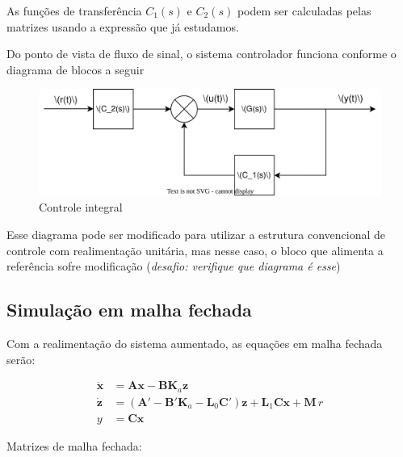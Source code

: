 \documentclass[
]{book}
\begin{document}
As funções de transferência \(C_1(s)\) e \(C_2(s)\) podem ser calculadas
pelas matrizes usando a expressão que já estudamos.

Do ponto de vista de fluxo de sinal, o sistema controlador funciona
conforme o diagrama de blocos a seguir

\begin{figure}
\includegraphics[width=1\linewidth]{./figs/controleIntegral} \caption{Controle integral}\label{fig:unnamed-chunk-45}
\end{figure}

Esse diagrama pode ser modificado para utilizar a estrutura convencional
de controle com realimentação unitária, mas nesse caso, o bloco que
alimenta a referência sofre modificação (\emph{desafio: verifique que
diagrama é esse})

\hypertarget{simulauxe7uxe3o-em-malha-fechada-1}{%
\subsection{Simulação em malha fechada}\label{simulauxe7uxe3o-em-malha-fechada-1}}

Com a realimentação do sistema aumentado, as equações em malha fechada
serão:

\begin{align*}
\dot{\mathbf{x}} &= \mathbf{A}\mathbf{x}-\mathbf{B}\mathbf{K}_a\mathbf{z}\\
\dot{\mathbf{z}} &= (\mathbf{A'}-\mathbf{B'}\mathbf{K}_a-\mathbf{L}_0\mathbf{C}')\mathbf{z}+\mathbf{L}_1\mathbf{C}\mathbf{x}+\mathbf{M}\, r\\
y&= \mathbf{Cx}
\end{align*}

Matrizes de malha fechada:
\end{document}
